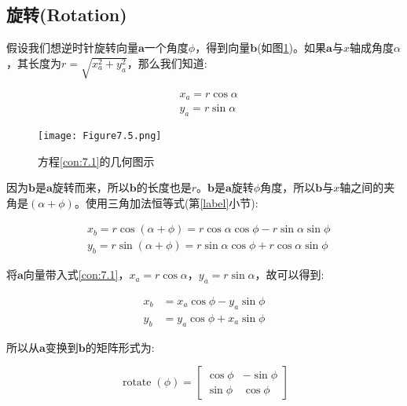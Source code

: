 \subsection{旋转(Rotation)}

假设我们想逆时针旋转向量$\mathbf{a}$一个角度$\phi$，得到向量$\mathbf{b}$(如图\ref{fig:7.5})。如果$\mathbf{a}$与$x$轴成角度$\alpha$，其长度为$r=\sqrt{x_a^2+y_a^2}$，那么我们知道:

\begin{equation}
	\begin{aligned}
		& x_a=r \cos \alpha \\
		& y_a=r \sin \alpha
	\end{aligned}
\nonumber
\end{equation}

\begin{figure}[htbp]
	\centering
	\texttt{[image: Figure7.5.png]}
	\caption{方程\ref{con:7.1}的几何图示}
	\label{fig:7.5}
\end{figure}	

因为$\mathbf{b}$是$\mathbf{a}$旋转而来，所以$\mathbf{b}$的长度也是$r$。$\mathbf{b}$是$\mathbf{a}$旋转$\phi$角度，所以$\mathbf{b}$与$x$轴之间的夹角是$(\alpha + \phi)$。使用三角加法恒等式(第\ref{label}小节):

\begin{equation}\label{con:7.1}
	\begin{aligned}
		& x_b=r \cos (\alpha+\phi)= r \cos \alpha \cos \phi-r \sin \alpha \sin \phi \\
		& y_b=r \sin (\alpha+\phi)= r \sin \alpha \cos \phi+r \cos \alpha \sin \phi
	\end{aligned}
\end{equation}

将$\mathbf{a}$向量带入式\ref{con:7.1}，$x_a=r \cos \alpha$，$y_a=r \sin \alpha$，故可以得到:

\begin{equation}
	\begin{aligned}
		 x_b &= x_a \cos \phi - y_a \sin \phi \\
		 y_b &= y_a \cos \phi + x_a \sin \phi
	\end{aligned}
\nonumber
\end{equation}

所以从$\mathbf{a}$变换到$\mathbf{b}$的矩阵形式为:

\begin{equation}
	\operatorname{rotate}(\phi)=\left[\begin{array}{rr}
		\cos \phi & -\sin \phi \\
		\sin \phi & \cos \phi
	\end{array}\right]
\nonumber
\end{equation}

